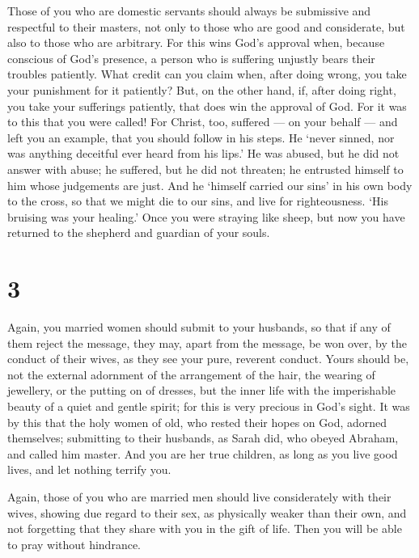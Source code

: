  Those of you who are domestic servants should always be
submissive and respectful to their masters, not only to those who are
good and considerate, but also to those who are arbitrary. 
For this wins God's approval when, because conscious of God's presence,
a person who is suffering unjustly bears their troubles patiently.
 What credit can you claim when, after doing wrong, you
take your punishment for it patiently? But, on the other hand, if, after
doing right, you take your sufferings patiently, that does win the
approval of God.  For it was to this that you were called!
For Christ, too, suffered --- on your behalf --- and left you an
example, that you should follow in his steps.  He `never
sinned, nor was anything deceitful ever heard from his lips.'
 He was abused, but he did not answer with abuse; he
suffered, but he did not threaten; he entrusted himself to him whose
judgements are just.  And he `himself carried our sins' in
his own body to the cross, so that we might die to our sins, and live
for righteousness. `His bruising was your healing.'  Once
you were straying like sheep, but now you have returned to the shepherd
and guardian of your souls.

\hypertarget{section-2}{%
\section{3}\label{section-2}}

 Again, you married women should submit to your husbands, so
that if any of them reject the message, they may, apart from the
message, be won over, by the conduct of their wives,  as
they see your pure, reverent conduct.  Yours should be, not
the external adornment of the arrangement of the hair, the wearing of
jewellery, or the putting on of dresses,  but the inner life
with the imperishable beauty of a quiet and gentle spirit; for this is
very precious in God's sight.  It was by this that the holy
women of old, who rested their hopes on God, adorned themselves;
submitting to their husbands,  as Sarah did, who obeyed
Abraham, and called him master. And you are her true children, as long
as you live good lives, and let nothing terrify you.

 Again, those of you who are married men should live
considerately with their wives, showing due regard to their sex, as
physically weaker than their own, and not forgetting that they share
with you in the gift of life. Then you will be able to pray without
hindrance.

